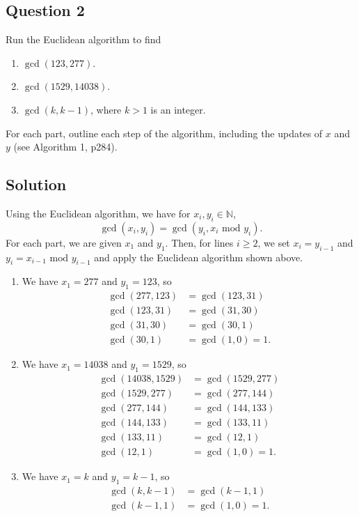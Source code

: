 \documentclass{article}
\begin{document}
\subsection*{Question 2}
    Run the Euclidean algorithm to find
    \begin{enumerate}
        \item $\gcd(123, 277)$.
        \item $\gcd(1529, 14038).$
        \item $\gcd(k, k - 1)$, where $k > 1$ is an integer.
    \end{enumerate}
    For each part, outline each step of the algorithm, including the updates of $x$ and $y$ (see Algorithm 1, p284).

\subsection*{Solution}
    Using the Euclidean algorithm, we have for $x_{i}, y_{i} \in \mathbb{N}$, $$\gcd(x_{i}, y_{i}) = \gcd(y_{i}, x_{i} \text{ mod }y_{i}).$$ For each part, we are given $x_{1}$ and $y_{1}$. Then, for lines $i \ge 2$, we set $x_{i} = y_{i-1}$ and $y_{i} = x_{i-1} \text{ mod }y_{i-1}$ and apply the Euclidean algorithm shown above.
    \begin{enumerate}
        \item We have $x_{1} = 277$ and $y_{1} = 123$, so
        $$\begin{aligned}
            \gcd(277, 123) &= \gcd(123, 31) \\
            \gcd(123, 31) &= \gcd(31, 30) \\
            \gcd(31, 30) &= \gcd(30, 1) \\
            \gcd(30, 1) &= \gcd(1, 0) = 1.
        \end{aligned}$$
        \item We have $x_{1} = 14038$ and $y_{1} = 1529$, so
        $$\begin{aligned}
            \gcd(14038, 1529) &= \gcd(1529, 277) \\
            \gcd(1529, 277) &= \gcd(277, 144) \\
            \gcd(277, 144) &= \gcd(144, 133) \\
            \gcd(144, 133) &= \gcd(133, 11) \\
            \gcd(133, 11) &= \gcd(12, 1) \\
            \gcd(12, 1) &= \gcd(1, 0) = 1.
        \end{aligned}$$
        \item We have $x_{1} = k$ and $y_{1} = k - 1$, so
        $$\begin{aligned}
            \gcd(k, k - 1) &= \gcd(k - 1, 1) \\
            \gcd(k - 1, 1) &= \gcd(1, 0) = 1. \\
        \end{aligned}$$
    \end{enumerate}
\end{document}
